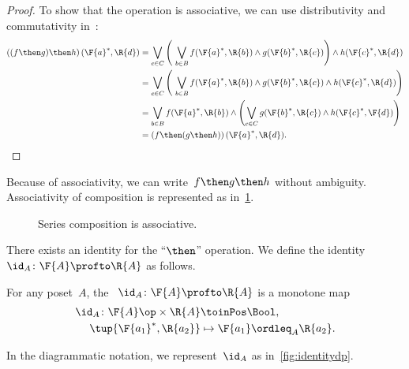 \begin{proof}
  To show that the operation is associative, we can use distributivity and commutativity in~\Bool:
%
  \begin{equation}
    \begin{aligned}
      \left((f\then g) \then h\right) (\F{a}^*,\R{d})
      &= \bigvee_{c \in C} \left (\ \bigvee_{b\in B } f(\F{a}^*,\R{b}) \wedge g(\F{b}^*,\R{c}) \right )  \wedge  h (\F{c}^*, \R{d}) \\
      &= \bigvee_{c \in C} \left (\ \bigvee_{b\in B } f(\F{a}^*,\R{b})
      \wedge g(\F{b}^*,\R{c}) \wedge h (\F{c}^*, \R{d})
      \right ) \\
      &= \bigvee_{b \in B } f(\F{a}^*,\R{b}) \wedge \left ( \bigvee_{c\in C} g(\F{b}^*,\R{c}) \wedge h (\F{c}^*, \F{d}) \right ) \\
      &= \left(f \then (g \then h )\right) (\F{a}^*, \R{d}).
    \end{aligned}
  \end{equation}
%
\end{proof}

Because of associativity, we can write~$f\then g\then h$ without ambiguity.
Associativity of composition is represented as in~\cref{fig:compositionassociativity}.

\begin{figure}[h!]
  \begin{center}
  \end{center}
  \caption{Series composition is associative. \label{fig:compositionassociativity}}
\end{figure}

There exists an identity for the ``$\then$'' operation.
We define the identity~$\id_A\colon \F{A} \profto \R{A}$ as follows.

\begin{definition}
  \label{def:dp-identity}
  For any poset~$A$, the \emph{}~$\id_A\colon \F{A} \profto \R{A}$ is a monotone map
  \begin{equation}
    \begin{aligned}
      \id_A \colon \F{A}\op \times \R{A} & \toinPos   \Bool, \label{eq:identity}\\
      \tup{\F{a_1}^*, \R{a_2}} & \mapsto \F{a_1} \ordleq_{A} \R{a_2}.
    \end{aligned}
  \end{equation}
\end{definition}
In the diagrammatic notation, we represent~$\id_A$ as in~\cref{fig:identitydp}.


